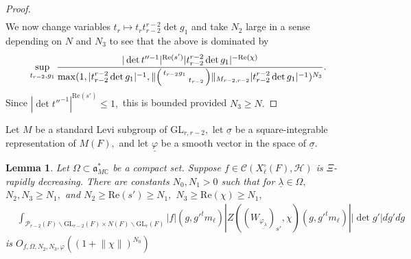 \documentclass[12pt]{amsart}
\newtheorem{lem}[thm]{Lemma}
\theoremstyle{remark}
\numberwithin{equation}{section}
\newcommand{\GL}{\mathrm{GL}}
\newcommand{\CC}{\mathbb{C}}
\theoremstyle{definition}
\newenvironment{psmatrix}
  {\left(\begin{smallmatrix}}
  {\end{smallmatrix}\right)}
\numberwithin{equation}{subsection}
\newcommand{\norm}[1]{\lVert#1\rVert}
\begin{document}
\begin{proof}
\begin{align*}
\end{align*}
We now change variables $t_r \mapsto t_rt_{r-2}^{r-2}\det g_1$ and take $N_2$ large in a sense depending on $N$ and $N_3$ to see that the above is dominated by 
\begin{align*}
    \sup_{t_{r-2},g_1}\frac{|\det t''^{-1}|^{\mathrm{Re}(s')}|t_{r-2}^{r-2}\det g_1|^{-\mathrm{Re}(\chi)}}{\max(1,|t_{r-2}^{r-2}\det g_1|^{-1},\norm{\begin{psmatrix} t_{r-2}g_1 &  \\ & t_{r-2} \end{psmatrix}}_{M_{r-2,r-2}}|t_{r-2}^{r-2}\det g_1|^{-1})^{N_3}}.
\end{align*}
Since $|\det t''^{-1}|^{\mathrm{Re}(s')}\leq 1,$ this is bounded provided $N_3\geq N.$
\end{proof}




Let $M$ be a standard Levi subgroup of $\GL_{r,r-2},$ let $\underline{\sigma}$ be a square-integrable representation of $M(F),$ and let $\underline{\varphi}$ be a smooth vector in the space of $\underline{\sigma}.$ 
 


\begin{lem} \label{lem:ZfW2}
 Let $\Omega \subset \mathfrak{a}_{M\CC}^*$ be a compact set. Suppose $f \in \mathcal{C}(X_{\ell}^\circ(F),\mathcal{H})$ is $\Xi$-rapidly decreasing.
  There are constants $N_0,N_1>0$ such that for $\underline{\lambda}\in \Omega,$ $N_2,N_3 \geq N_1,$ and $N_2\ge \mathrm{Re}(s')\ge N_1,$ $N_3\ge \mathrm{Re}(\chi)  \ge N_1,$
\begin{align} \label{to:bound:619}
&\int_{\mathcal{P}_{r-2}(F) \backslash \GL_{r-2}(F) \times N(F) \backslash \GL_r(F)} |f|(g,g'^tm_\ell)|Z((W_{\underline{\varphi_{\lambda}}})_{s'},\chi)(g,g'^tm_{\ell})||\det g'| d\dot{g}'d\dot{g}
\end{align}
is $O_{f,\Omega,N_2,N_3, \varphi}\left((1+\norm{\chi})^{N_0}\right)$
\end{lem}
\end{document}
